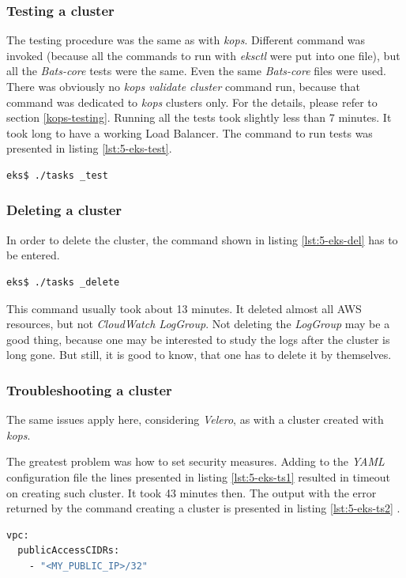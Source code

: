 \subsubsection{Testing a cluster}
The testing procedure was the same as with \textit{kops}. Different command was invoked (because all the commands to run with \textit{eksctl} were put into one file), but all the \textit{Bats-core} tests were the same. Even the same \textit{Bats-core} files were used. There was obviously no \textit{kops validate cluster} command run, because that command was dedicated to \textit{kops} clusters only. For the details, please refer to section \ref{kops-testing}. Running all the tests took slightly less than 7 minutes. It took long to have a working Load Balancer. The command to run tests was presented in listing \ref{lst:5-eks-test}.
\begin{lstlisting}[basicstyle=\scriptsize,xleftmargin=0cm,label=lst:5-eks-test,caption={Testing an \textit{eksctl} cluster},captionpos=b,language=Bash ]
eks$ ./tasks _test
\end{lstlisting}

\subsubsection{Deleting a cluster}
In order to delete the cluster, the command shown in listing \ref{lst:5-eks-del} has to be entered.
\begin{lstlisting}[basicstyle=\scriptsize,xleftmargin=0cm,label=lst:5-eks-del,caption={Deleting an \textit{eksctl} cluster},captionpos=b,language=Bash ]
eks$ ./tasks _delete
\end{lstlisting}

This command usually took about 13 minutes. It deleted almost all AWS resources, but not \textit{CloudWatch LogGroup}. Not deleting the \textit{LogGroup} may be a good thing, because one may be interested to study the logs after the cluster is long gone. But still, it is good to know, that one has to delete it by themselves.

\subsubsection{Troubleshooting a cluster}
\label{eks-troubleshooting}

The same issues apply here, considering \textit{Velero}, as with a cluster created with \textit{kops}.


The greatest problem was how to set security measures. Adding to the \textit{YAML} configuration file the lines presented in listing \ref{lst:5-eks-ts1} resulted in timeout on creating such cluster. It took 43 minutes then. The output with the error returned by the command creating a cluster is presented in listing \ref{lst:5-eks-ts2} .
\begin{lstlisting}[basicstyle=\scriptsize,xleftmargin=0cm,label=lst:5-eks-ts1,caption={Attempt to setup security},captionpos=b,language=Bash ]
vpc:
  publicAccessCIDRs:
    - "<MY_PUBLIC_IP>/32"
\end{lstlisting}


